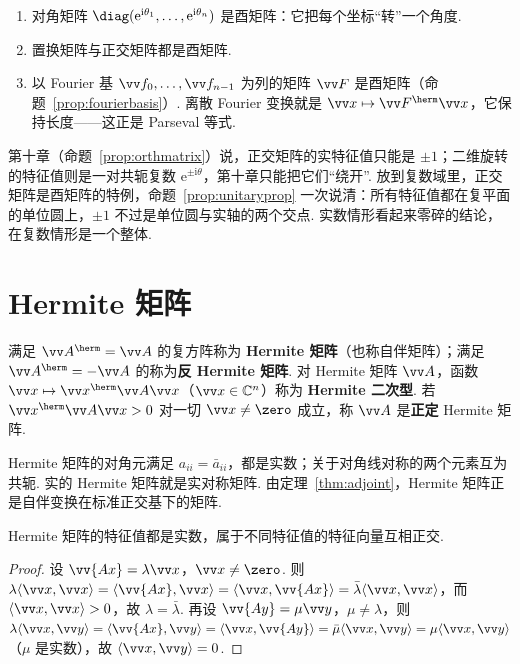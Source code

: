 	\begin{example}
		\begin{enumerate}
			\item 对角矩阵 $\diag(\mathrm e^{\mathrm i\theta_1},\ldots,\mathrm e^{\mathrm i\theta_n})$ 是酉矩阵：它把每个坐标“转”一个角度.
			\item 置换矩阵与正交矩阵都是酉矩阵.
			\item 以 Fourier 基 $\vv f_0,\ldots,\vv f_{n-1}$ 为列的矩阵 $\vv F$ 是酉矩阵（命题~\ref{prop:fourierbasis}）. 离散 Fourier 变换就是 $\vv x\mapsto\vv F^\herm\vv x$，它保持长度——这正是 Parseval 等式.
		\end{enumerate}
	\end{example}
	
	\begin{motivebox}
		第十章（命题~\ref{prop:orthmatrix}）说，正交矩阵的实特征值只能是 $\pm1$；二维旋转的特征值则是一对共轭复数 $\mathrm e^{\pm\mathrm i\theta}$，第十章只能把它们“绕开”. 放到复数域里，正交矩阵是酉矩阵的特例，命题~\ref{prop:unitaryprop} 一次说清：所有特征值都在复平面的单位圆上，$\pm1$ 不过是单位圆与实轴的两个交点. 实数情形看起来零碎的结论，在复数情形是一个整体.
	\end{motivebox}
	
	\section{\hC Hermite 矩阵}\label{sec:hermitian}
	
	\begin{definition}
		满足 $\vv A^\herm=\vv A$ 的复方阵称为 \textbf{Hermite 矩阵}（也称自伴矩阵）；满足 $\vv A^\herm=-\vv A$ 的称为\textbf{反 Hermite 矩阵}. 对 Hermite 矩阵 $\vv A$，函数 $\vv x\mapsto\vv x^\herm\vv A\vv x$（$\vv x\in\mathbb{C}^n$）称为 \textbf{Hermite 二次型}. 若 $\vv x^\herm\vv A\vv x>0$ 对一切 $\vv x\ne\zero$ 成立，称 $\vv A$ 是\textbf{正定} Hermite 矩阵.
	\end{definition}
	
	Hermite 矩阵的对角元满足 $a_{ii}=\bar a_{ii}$，都是实数；关于对角线对称的两个元素互为共轭. 实的 Hermite 矩阵就是实对称矩阵. 由定理~\ref{thm:adjoint}，Hermite 矩阵正是自伴变换在标准正交基下的矩阵.
	
	\begin{theorem}\label{thm:hermitianeig}
		Hermite 矩阵的特征值都是实数，属于不同特征值的特征向量互相正交.
	\end{theorem}
	\begin{proof}
		设 $\vv{Ax}=\lambda\vv x$，$\vv x\ne\zero$. 则 $\lambda\langle\vv x,\vv x\rangle=\langle\vv{Ax},\vv x\rangle=\langle\vv x,\vv{Ax}\rangle=\bar\lambda\langle\vv x,\vv x\rangle$，而 $\langle\vv x,\vv x\rangle>0$，故 $\lambda=\bar\lambda$. 再设 $\vv{Ay}=\mu\vv y$，$\mu\ne\lambda$，则 $\lambda\langle\vv x,\vv y\rangle=\langle\vv{Ax},\vv y\rangle=\langle\vv x,\vv{Ay}\rangle=\bar\mu\langle\vv x,\vv y\rangle=\mu\langle\vv x,\vv y\rangle$（$\mu$ 是实数），故 $\langle\vv x,\vv y\rangle=0$.
	\end{proof}
	
